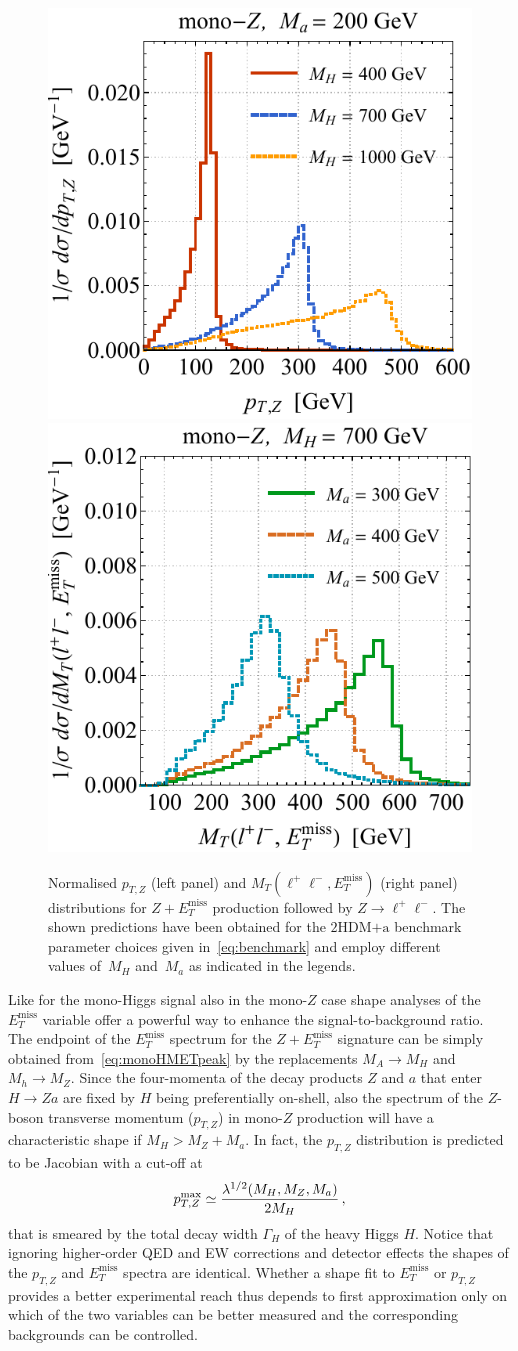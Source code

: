 \documentclass[a4paper, 11pt,notoc]{article}
\newcommand{\MET}{\ensuremath{E_T^\mathrm{miss}}\xspace}
\newcommand{\hdma}{\ensuremath{\textrm{2HDM+a}}\xspace}
\begin{document}
\begin{figure}[t!]
\centering
\includegraphics[height=0.45\textwidth]{ptzspec.pdf}	\qquad 
\includegraphics[height=0.45\textwidth]{mtspec.pdf}
\vspace{2mm}
\caption{\label{fig:zptmt} Normalised $p_{T,Z}$ (left panel) and $M_T (\ell^+ \ell^-, \MET)$ (right panel) distributions for $Z + \MET$ production followed by $Z \to \ell^+ \ell^-$. The shown predictions have been obtained for the \hdma benchmark parameter choices  given in~\eqref{eq:benchmark} and employ different values of~$M_H$ and~$M_a$ as indicated in the legends.}
\end{figure}

Like for the mono-Higgs signal also in the mono-$Z$ case shape analyses of the~$\MET$ variable offer a powerful way to enhance the signal-to-background ratio. The endpoint of the $\MET$ spectrum for the $Z+\MET$ signature can be simply obtained from~\eqref{eq:monoHMETpeak} by the replacements $M_A \to M_H$ and $M_h \to M_Z$.  Since the four-momenta of the decay products $Z$ and $a$ that enter $H \to Za$ are fixed by $H$ being preferentially on-shell, also the spectrum of the $Z$-boson transverse momentum ($p_{T,Z}$) in mono-$Z$ production will have a characteristic shape if $M_H > M_Z + M_a$.   In fact,  the $p_{T,Z}$ distribution is predicted  to be Jacobian with a cut-off at~\cite{No:2015xqa,Bauer:2017ota}
\begin{equation} \label{eq:monoZpTpeak}
p_{T,Z}^{ {\rm max} } \simeq \frac{\lambda^{1/2}(M_H, M_Z, M_a)}{2 M_H}\,,
\end{equation}
that is smeared by the total decay width $\Gamma_H$ of the heavy Higgs $H$. Notice that  ignoring higher-order QED and EW corrections and detector effects the shapes of the $p_{T,Z}$ and $\MET$ spectra are identical. Whether a shape fit to $\MET$ or $p_{T,Z}$ provides a better experimental reach thus depends to first approximation only on which of the two variables can be better measured and the corresponding backgrounds can be controlled.
\end{document}
